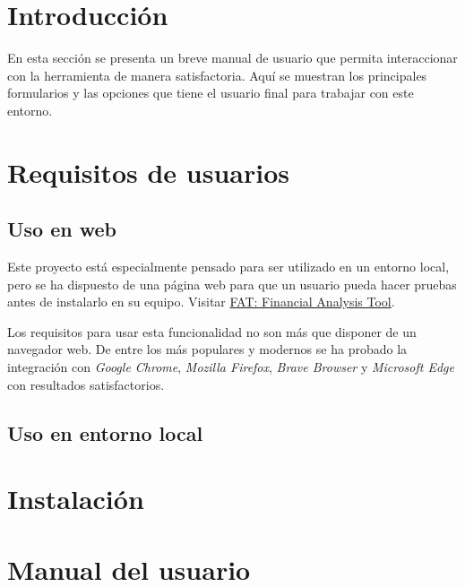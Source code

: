
\section{Introducción}

En esta sección se presenta un breve manual de usuario que permita interaccionar con la herramienta de manera satisfactoria. Aquí se muestran los principales formularios y las opciones que tiene el usuario final para trabajar con este entorno. 

\section{Requisitos de usuarios}

\subsection{Uso en web}

Este proyecto está especialmente pensado para ser utilizado en un entorno local, pero se ha dispuesto de una página web para que un usuario pueda hacer pruebas antes de instalarlo en su equipo. Visitar \href{http://takeiteasy.pythonanywhere.com/}{FAT: Financial Analysis Tool}.

Los requisitos para usar esta funcionalidad no son más que disponer de un navegador web. De entre los más populares y modernos se ha probado la integración con \emph{Google Chrome}, \emph{Mozilla Firefox}, \emph{Brave Browser} y \emph{Microsoft Edge} con resultados satisfactorios. 

\subsection{Uso en entorno local}



\section{Instalación}

\section{Manual del usuario}


